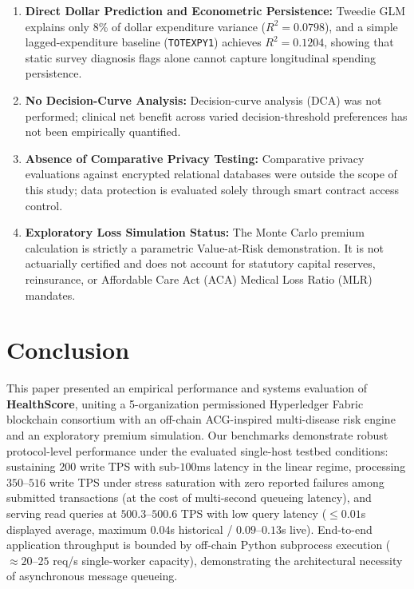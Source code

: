 \documentclass[runningheads]{llncs}
\begin{document}
\begin{enumerate}
    \item \textbf{Direct Dollar Prediction and Econometric Persistence:} Tweedie GLM explains only 8\% of dollar expenditure variance ($R^2 = 0.0798$), and a simple lagged-expenditure baseline (\texttt{TOTEXPY1}) achieves $R^2 = 0.1204$, showing that static survey diagnosis flags alone cannot capture longitudinal spending persistence.
    \item \textbf{No Decision-Curve Analysis:} Decision-curve analysis (DCA) was not performed; clinical net benefit across varied decision-threshold preferences has not been empirically quantified.
    \item \textbf{Absence of Comparative Privacy Testing:} Comparative privacy evaluations against encrypted relational databases were outside the scope of this study; data protection is evaluated solely through smart contract access control.
    \item \textbf{Exploratory Loss Simulation Status:} The Monte Carlo premium calculation is strictly a parametric Value-at-Risk demonstration. It is not actuarially certified and does not account for statutory capital reserves, reinsurance, or Affordable Care Act (ACA) Medical Loss Ratio (MLR) mandates.
\end{enumerate}

\section{Conclusion}
This paper presented an empirical performance and systems evaluation of \textbf{HealthScore}, uniting a 5-organization permissioned Hyperledger Fabric blockchain consortium with an off-chain ACG-inspired multi-disease risk engine and an exploratory premium simulation. Our benchmarks demonstrate robust protocol-level performance under the evaluated single-host testbed conditions: sustaining $200$ write TPS with sub-$100$ms latency in the linear regime, processing $350$--$516$ write TPS under stress saturation with zero reported failures among submitted transactions (at the cost of multi-second queueing latency), and serving read queries at $500.3$--$500.6$ TPS with low query latency ($\le 0.01$s displayed average, maximum $0.04$s historical / $0.09$--$0.13$s live). End-to-end application throughput is bounded by off-chain Python subprocess execution ($\approx 20$--$25$ req/s single-worker capacity), demonstrating the architectural necessity of asynchronous message queueing.
\end{document}
